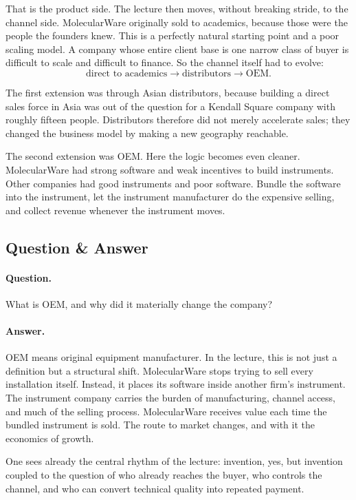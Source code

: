 That is the product side. The lecture then moves, without breaking stride, to the channel side. MolecularWare originally sold to academics, because those were the people the founders knew. This is a perfectly natural starting point and a poor scaling model. A company whose entire client base is one narrow class of buyer is difficult to scale and difficult to finance. So the channel itself had to evolve:
\begin{equation}
\text{direct to academics} \to \text{distributors} \to \text{OEM}.
\end{equation}

The first extension was through Asian distributors, because building a direct sales force in Asia was out of the question for a Kendall Square company with roughly fifteen people. Distributors therefore did not merely accelerate sales; they changed the business model by making a new geography reachable.

The second extension was OEM. Here the logic becomes even cleaner. MolecularWare had strong software and weak incentives to build instruments. Other companies had good instruments and poor software. Bundle the software into the instrument, let the instrument manufacturer do the expensive selling, and collect revenue whenever the instrument moves.

\subsection{Question \& Answer}

\paragraph{Question.} What is OEM, and why did it materially change the company?

\paragraph{Answer.} OEM means original equipment manufacturer. In the lecture, this is not just a definition but a structural shift. MolecularWare stops trying to sell every installation itself. Instead, it places its software inside another firm's instrument. The instrument company carries the burden of manufacturing, channel access, and much of the selling process. MolecularWare receives value each time the bundled instrument is sold. The route to market changes, and with it the economics of growth.

One sees already the central rhythm of the lecture: invention, yes, but invention coupled to the question of who already reaches the buyer, who controls the channel, and who can convert technical quality into repeated payment.

